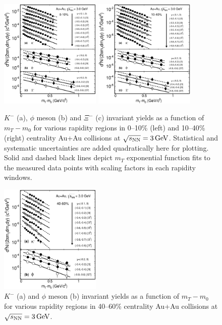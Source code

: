\documentclass[%
 reprint,	
showpacs,
 amsmath,amssymb,
 aps,
 superscriptaddress,
]{revtex4-1}
\begin{document}
\begin{figure}
\centering
\includegraphics[width=0.43\textwidth]{fig21.eps}
\includegraphics[width=0.43\textwidth]{fig22.eps}
\caption{$K^-$ (a), $\phi$ meson (b) and $\Xi^-$ (c) invariant yields as a function of $m_T-m_0$ for various rapidity regions in 0--10\% (left) and  10--40\% (right) centrality Au+Au collisions at ${\sqrt{s_{\rm NN}} = \rm{3\,GeV}}$. Statistical and systematic uncertainties are added quadratically here for plotting. Solid and dashed black lines depict $m_T$ exponential function fits to the measured data points with scaling factors in each rapidity windows.}
\label{fig:phimTSpectra21}
\end{figure}

\begin{figure}
\centering
\includegraphics[width=0.43\textwidth]{fig23.eps}
\caption{$K^-$ (a) and $\phi$ meson (b) invariant yields as a function of $m_T-m_0$ for various rapidity regions in 40--60\% centrality Au+Au collisions at ${\sqrt{s_{\rm NN}} = \rm{3\,GeV}}$.}
\label{fig:phimTSpectra23}
\end{figure}
\end{document}
